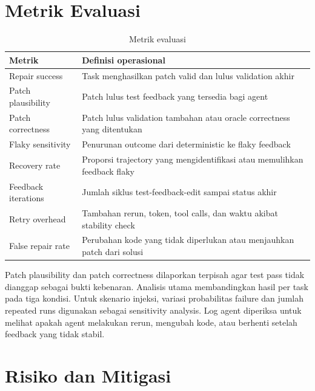 \section{Metrik Evaluasi}

\begin{table}[htbp]
\centering
\small
\caption{Metrik evaluasi}
\label{tab:metrics}
\begin{tabularx}{\textwidth}{p{3.6cm}Y}
\toprule
\textbf{Metrik} & \textbf{Definisi operasional} \\
\midrule
Repair success & Task menghasilkan patch valid dan lulus validation akhir \\
Patch plausibility & Patch lulus test feedback yang tersedia bagi agent \\
Patch correctness & Patch lulus validation tambahan atau oracle correctness yang ditentukan \\
Flaky sensitivity & Penurunan outcome dari deterministic ke flaky feedback \\
Recovery rate & Proporsi trajectory yang mengidentifikasi atau memulihkan feedback flaky \\
Feedback iterations & Jumlah siklus test-feedback-edit sampai status akhir \\
Retry overhead & Tambahan rerun, token, tool calls, dan waktu akibat stability check \\
False repair rate & Perubahan kode yang tidak diperlukan atau menjauhkan patch dari solusi \\
\bottomrule
\end{tabularx}
\end{table}

Patch plausibility dan patch correctness dilaporkan terpisah agar test pass tidak dianggap sebagai bukti kebenaran. Analisis utama membandingkan hasil per task pada tiga kondisi. Untuk skenario injeksi, variasi probabilitas failure dan jumlah repeated runs digunakan sebagai sensitivity analysis. Log agent diperiksa untuk melihat apakah agent melakukan rerun, mengubah kode, atau berhenti setelah feedback yang tidak stabil.

\section{Risiko dan Mitigasi}

